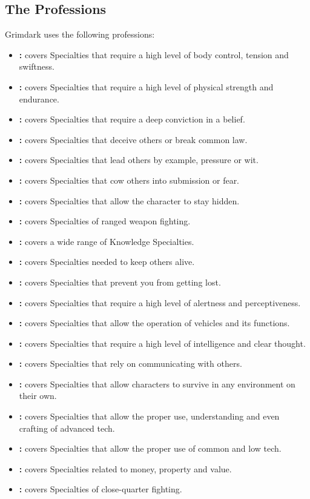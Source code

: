 \subsection{The Professions}
Grimdark uses the following professions:
\begin{itemize}
	\item \textbf{:} covers Specialties that require a high level of body control, tension and swiftness.
	\item \textbf{:} covers Specialties that require a high level of physical strength and endurance.
	\item \textbf{:} covers Specialties that require a deep conviction in a belief.
	\item \textbf{:} covers Specialties that deceive others or break common law.
	\item \textbf{:} covers Specialties that lead others by example, pressure or wit.
	\item \textbf{:} covers Specialties that cow others into submission or fear.
	\item \textbf{:} covers Specialties that allow the character to stay hidden.
	\item \textbf{:} covers Specialties of ranged weapon fighting.
	\item \textbf{:} covers a wide range of Knowledge Specialties.
	\item \textbf{:} covers Specialties needed to keep others alive.
	\item \textbf{:} covers Specialties that prevent you from getting lost.
	\item \textbf{:} covers Specialties that require a high level of alertness and perceptiveness.
	\item \textbf{:} covers Specialties that allow the operation of vehicles and its functions.
	\item \textbf{:} covers Specialties that require a high level of intelligence and clear thought.
	\item \textbf{:} covers Specialties that rely on communicating with others.
	\item \textbf{:} covers Specialties that allow characters to survive in any environment on their own.
	\item \textbf{:} covers Specialties that allow the proper use, understanding and even crafting of advanced tech.
	\item \textbf{:} covers Specialties that allow the proper use of common and low tech.
	\item \textbf{:} covers Specialties related to money, property and value.
	\item \textbf{:} covers Specialties of close-quarter fighting.
\end{itemize}


